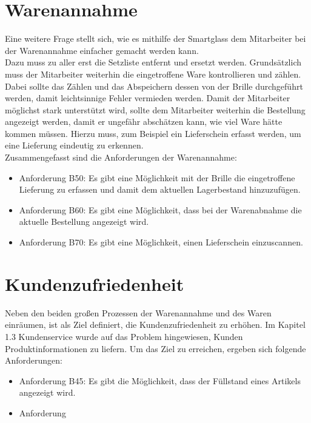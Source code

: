 \section{Warenannahme}
Eine weitere Frage stellt sich, wie es mithilfe der Smartglass dem Mitarbeiter bei der Warenannahme einfacher gemacht werden kann. \\
Dazu muss zu aller erst die Setzliste entfernt und ersetzt werden. Grundsätzlich muss der Mitarbeiter weiterhin die eingetroffene Ware kontrollieren und zählen. Dabei sollte das Zählen und das Abspeichern dessen von der Brille durchgeführt werden, damit leichtsinnige Fehler vermieden werden. Damit der Mitarbeiter möglichst stark unterstützt wird, sollte dem Mitarbeiter weiterhin die Bestellung angezeigt werden, damit er ungefähr abschätzen kann, wie viel Ware hätte kommen müssen. Hierzu muss, zum Beispiel ein Lieferschein erfasst werden, um eine Lieferung eindeutig zu erkennen.\\
Zusammengefasst sind die Anforderungen der Warenannahme: 

\begin{itemize}
	\item Anforderung B50: Es gibt eine Möglichkeit mit der Brille die eingetroffene Lieferung zu erfassen und damit dem aktuellen Lagerbestand hinzuzufügen. \label{anforderung_b50}
	\item Anforderung B60: Es gibt eine Möglichkeit, dass bei der Warenabnahme die aktuelle Bestellung angezeigt wird. \label{anforderung_b60}
	\item Anforderung B70: Es gibt eine Möglichkeit, einen Lieferschein einzuscannen. \label{anforderung_b70}
\end{itemize}
\section{Kundenzufriedenheit} 
Neben den beiden großen Prozessen der Warenannahme und des Waren einräumen, ist als Ziel definiert, die Kundenzufriedenheit zu erhöhen. Im Kapitel 1.3 Kundenservice wurde auf das Problem hingewiesen, Kunden Produktinformationen zu liefern. Um das Ziel zu erreichen, ergeben sich folgende Anforderungen: 
\begin{itemize}
	\item Anforderung B45: Es gibt die Möglichkeit, dass der Füllstand eines Artikels angezeigt wird. \label{anforderung_b45}
	\item Anforderung 
	
\end{itemize}
